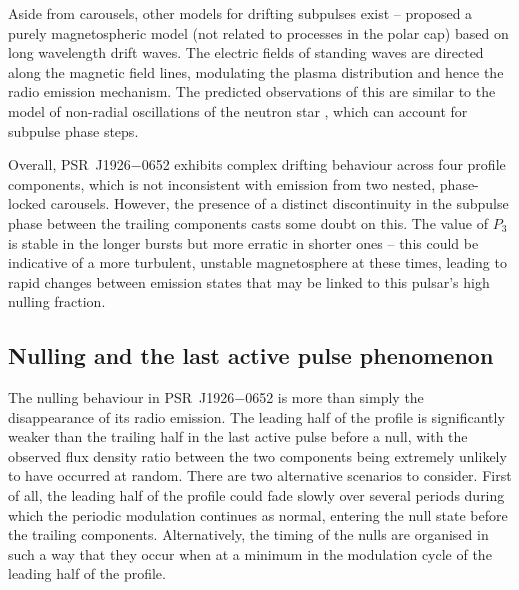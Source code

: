 Aside from carousels, other models for drifting subpulses exist -- \citet{GMML2005} proposed a purely magnetospheric model (not related to processes in the polar cap) based on long wavelength drift waves. The electric fields of standing waves are directed along the magnetic field lines, modulating the plasma distribution and hence the radio emission mechanism. The predicted observations of this are similar to the model of non-radial oscillations of the neutron star \citep[e.g.][]{DCxx1968, CRxx2004}, which can account for subpulse phase steps.


 Overall, PSR~J1926$-$0652 exhibits complex drifting behaviour across four profile components, which is not inconsistent with emission from two nested, phase-locked carousels. However, the presence of a distinct discontinuity in the subpulse phase between the trailing components casts some doubt on this. The value of $P_3$ is stable in the longer bursts but more erratic in shorter ones -- this could be indicative of a more turbulent, unstable magnetosphere at these times, leading to rapid changes between emission states that may be linked to this pulsar's high nulling fraction.



\subsection{Nulling and the last active pulse phenomenon}
\label{sec: J1926 - discuss - LAP}

The nulling behaviour in PSR~J1926$-$0652 is more than simply the disappearance of its radio emission. The leading half of the profile is significantly weaker than the trailing half in the last active pulse before a null, with the observed flux density ratio between the two components being extremely unlikely to have occurred at random. 
There are two alternative scenarios to consider. First of all, the leading half of the profile could fade slowly over several periods during which the periodic modulation continues as normal, entering the null state before the trailing components. Alternatively, the timing of the nulls are organised in such a way that they occur when at a minimum in the modulation cycle of the leading half of the profile.

